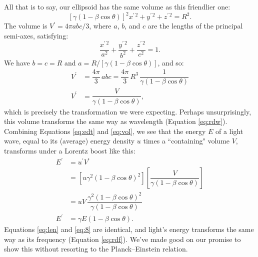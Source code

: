 \documentclass[12pt]{article}
\begin{document}
All that is to say, our ellipsoid has the same volume as this friendlier one:
\begin{equation*}
\left[ \gamma ( 1 - \beta \cos{\theta} ) \right]^2 x^{\prime \, 2} + y^{\prime \, 2} + z^{\prime \, 2} = R^2 .
\end{equation*}
The volume is $V^\prime = 4 \pi abc / 3$, where $a$, $b$, and $c$ are the lengths of the principal semi-axes, satisfying:
\begin{equation*}
\dfrac{x^{\prime \, 2}}{a^2} + \dfrac{y^{\prime \, 2}}{b^2} + \dfrac{z^{\prime \, 2}}{c^2} = 1 .
\end{equation*}
We have $b = c = R$ and $a = R / [\gamma ( 1 - \beta \cos{\theta} )]$, and so:
\begin{equation}\label{eq:vol}
\begin{split}
V^\prime &= \dfrac{4 \pi}{3} \, abc = \dfrac{4 \pi }{3} \, R^3 \, \dfrac{1}{\gamma \left( 1 - \beta \cos{\theta} \right)} \\
V^\prime &= \dfrac{V}{\gamma \left( 1 - \beta \cos{\theta} \right)} ,
\end{split}
\end{equation}
which is precisely the transformation we were expecting. Perhaps unsurprisingly, this volume transforms the same way as wavelength (Equation \ref{eq:rdw}). Combining Equations \ref{eq:edt} and \ref{eq:vol}, we see that the energy $E$ of a light wave, equal to its (average) energy density $u$ times a ``containing" volume $V$, transforms under a Lorentz boost like this:
\begin{equation}\label{eq:len}
\begin{split}
E^\prime &= u^\prime V^\prime \\
&= \left[ u \gamma^2 ( 1 - \beta \cos{\theta} )^2  \right] \left[ \dfrac{V}{\gamma ( 1 - \beta \cos{\theta} )} \right] \\[4pt]
&= uV \, \dfrac{\gamma^2 ( 1 - \beta \cos{\theta} )^2}{\gamma ( 1 - \beta \cos{\theta} )} \\[5pt]
E^\prime &= \gamma E \left( 1 - \beta \cos{\theta} \right) .
\end{split}
\end{equation}
Equations \ref{eq:len} and \ref{eq:8} are identical, and light's energy transforms the same way as its frequency (Equation \ref{eq:rdf}). We've made good on our promise to show this without resorting to the Planck--Einstein relation.
\end{document}
